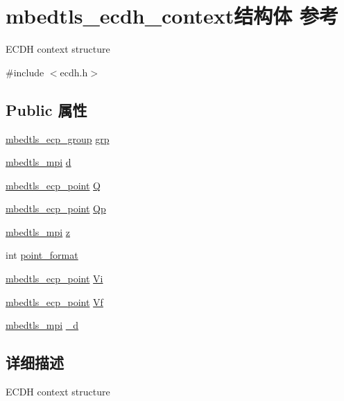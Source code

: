 \hypertarget{structmbedtls__ecdh__context}{}\section{mbedtls\+\_\+ecdh\+\_\+context结构体 参考}
\label{structmbedtls__ecdh__context}


E\+C\+DH context structure  




{\ttfamily \#include $<$ecdh.\+h$>$}

\subsection*{Public 属性}
\begin{DoxyCompactItemize}
\item 
\hyperlink{structmbedtls__ecp__group}{mbedtls\+\_\+ecp\+\_\+group} \hyperlink{structmbedtls__ecdh__context_a9fd1b03576203de87a92a2d49a4d20ed}{grp}
\item 
\hyperlink{structmbedtls__mpi}{mbedtls\+\_\+mpi} \hyperlink{structmbedtls__ecdh__context_a22e51b2ea7d4728e48e8897535831cf4}{d}
\item 
\hyperlink{structmbedtls__ecp__point}{mbedtls\+\_\+ecp\+\_\+point} \hyperlink{structmbedtls__ecdh__context_af2657e12e87be5b3e73bcf1ea2941d0b}{Q}
\item 
\hyperlink{structmbedtls__ecp__point}{mbedtls\+\_\+ecp\+\_\+point} \hyperlink{structmbedtls__ecdh__context_a64ecde7d95dcc725d6af5f8e3ce542ca}{Qp}
\item 
\hyperlink{structmbedtls__mpi}{mbedtls\+\_\+mpi} \hyperlink{structmbedtls__ecdh__context_abfd253d99f23c57cbeafc41985db764c}{z}
\item 
int \hyperlink{structmbedtls__ecdh__context_ae7ae7b0231e898b0d973df360aea8f17}{point\+\_\+format}
\item 
\hyperlink{structmbedtls__ecp__point}{mbedtls\+\_\+ecp\+\_\+point} \hyperlink{structmbedtls__ecdh__context_a6e374b0be49dce0fb02ca8ccfbfe1fee}{Vi}
\item 
\hyperlink{structmbedtls__ecp__point}{mbedtls\+\_\+ecp\+\_\+point} \hyperlink{structmbedtls__ecdh__context_a2ee12052791b2f212047a16b4e0dcc77}{Vf}
\item 
\hyperlink{structmbedtls__mpi}{mbedtls\+\_\+mpi} \hyperlink{structmbedtls__ecdh__context_af5412a43eb79b11a6cc13c3a9af55e13}{\+\_\+d}
\end{DoxyCompactItemize}


\subsection{详细描述}
E\+C\+DH context structure 

